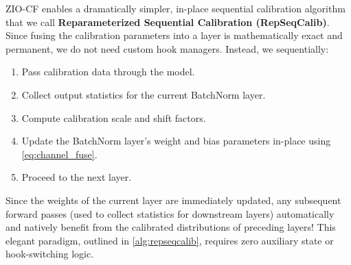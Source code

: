 \documentclass{article}
\begin{document}
ZIO-CF enables a dramatically simpler, in-place sequential calibration algorithm that we call \textbf{Reparameterized Sequential Calibration (RepSeqCalib)}. Since fusing the calibration parameters into a layer is mathematically exact and permanent, we do not need custom hook managers. Instead, we sequentially:
\begin{enumerate}
    \item Pass calibration data through the model.
    \item Collect output statistics for the current BatchNorm layer.
    \item Compute calibration scale and shift factors.
    \item Update the BatchNorm layer's weight and bias parameters in-place using \cref{eq:channel_fuse}.
    \item Proceed to the next layer.
\end{enumerate}
Since the weights of the current layer are immediately updated, any subsequent forward passes (used to collect statistics for downstream layers) automatically and natively benefit from the calibrated distributions of preceding layers! This elegant paradigm, outlined in \cref{alg:repseqcalib}, requires zero auxiliary state or hook-switching logic.
\end{document}
